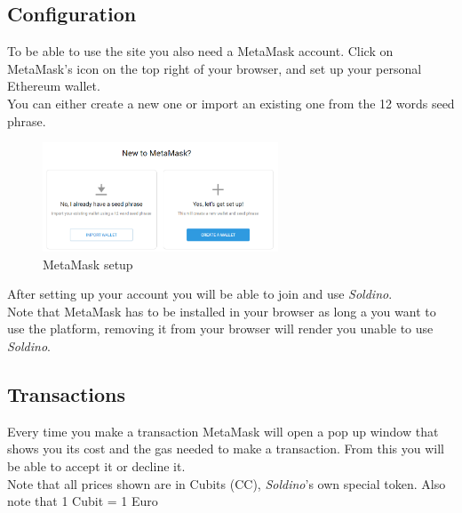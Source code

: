 	\subsection{Configuration}
	To be able to use the site you also need a MetaMask account. Click on 
	MetaMask's icon on the top right of your browser, and set up your 
	personal Ethereum wallet.\\
	You can either create a new one or import an existing one from the 12 
	words seed phrase.
	\begin{figure}[H]
		\includegraphics[width=7cm]{res/images/metamask_select.png}
		\centering
		\caption{MetaMask setup}
	\end{figure}
	\noindent After setting up your account you will be able to join and use 
	\textit{Soldino}.
	\newline \\
	Note that MetaMask has to be installed in your browser as long a you want 
	to use the platform, removing it from your browser will render you unable to
	use \textit{Soldino}.
	\subsection{Transactions}
	Every time you make a transaction MetaMask will open a pop up window that 
	shows you its cost and the gas needed to make a transaction. From this you 
	will be able to accept it or decline it.\\
	Note that all prices shown are in Cubits (CC), \textit{Soldino}'s own special token. Also note that 1 Cubit = 1 Euro
	
	
	
	